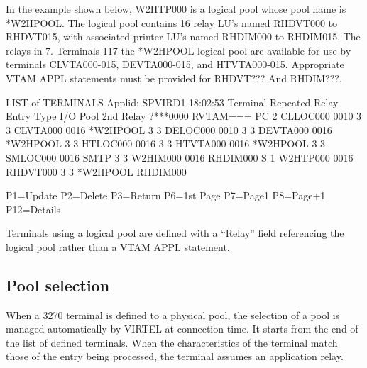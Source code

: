 \documentclass[letterpaper,10pt,english]{sphinxmanual}
\begin{document}
In the example shown below, W2HTP000 is a logical pool whose pool name is *W2HPOOL. The logical pool contains 16 relay LU’s named RHDVT000 to RHDVT015, with associated printer LU’s named RHDIM000 to RHDIM015. The relays in 7. Terminals 117 the *W2HPOOL logical pool are available for use by terminals CLVTA000-015, DEVTA000-015, and HTVTA000-015. Appropriate VTAM APPL statements must be provided for RHDVT??? And RHDIM???.

\begin{sphinxVerbatim}[commandchars=\\\{\}]
LIST of TERMINALS \PYGZhy{}\PYGZhy{}\PYGZhy{}\PYGZhy{}\PYGZhy{}\PYGZhy{}\PYGZhy{}\PYGZhy{}\PYGZhy{}\PYGZhy{}\PYGZhy{}\PYGZhy{}\PYGZhy{}\PYGZhy{}\PYGZhy{}\PYGZhy{}\PYGZhy{}\PYGZhy{}\PYGZhy{}\PYGZhy{}\PYGZhy{}\PYGZhy{}\PYGZhy{}\PYGZhy{}\PYGZhy{}\PYGZhy{}\PYGZhy{}\PYGZhy{}\PYGZhy{}\PYGZhy{}\PYGZhy{}\PYGZhy{}\PYGZhy{}\PYGZhy{} Applid: SPVIRD1 18:02:53
Terminal Repeated    Relay       Entry    Type I/O  Pool      2nd Relay
?***0000             RVTAM===    PC       2
CLLOC000 0010                             3    3
CLVTA000 0016        *W2HPOOL             3    3
DELOC000 0010                             3    3
DEVTA000 0016        *W2HPOOL             3    3
HTLOC000 0016                             3    3
HTVTA000 0016        *W2HPOOL             3    3
SMLOC000 0016                    SMTP     3    3
W2HIM000 0016        RHDIM000             S    1
W2HTP000 0016        RHDVT000             3    3    *W2HPOOL   RHDIM000



P1=Update            P2=Delete            P3=Return             P6=1st Page
P7=Page\PYGZhy{}1            P8=Page+1            P12=Details
\end{sphinxVerbatim}


Terminals using a logical pool are defined with a “Relay” field referencing the logical pool rather than a VTAM APPL statement.


\subsection{Pool selection}
\label{\detokenize{connectivity_guide:pool-selection}}
When a 3270 terminal is defined to a physical pool, the selection of a pool is managed automatically by VIRTEL at connection time. It starts from the end of the list of defined terminals. When the characteristics of the terminal match those of the entry being processed, the terminal assumes an application relay.
\end{document}
